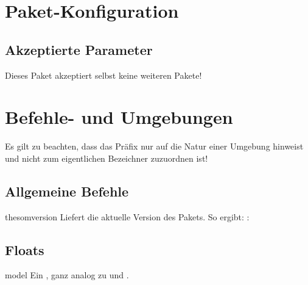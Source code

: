 \documentclass{sopra-base}
\begin{document}
\section{Paket-Konfiguration}
    \subsection{Akzeptierte Parameter}
    Dieses Paket akzeptiert selbst keine weiteren Pakete!

%
%

\section{Befehle- und Umgebungen}

Es gilt zu beachten, dass das Präfix  nur auf die Natur einer Umgebung hinweist und nicht zum eigentlichen Bezeichner zuzuordnen ist!

\subsection{Allgemeine Befehle}

\begin{command}{thesomversion}{}
    Liefert die aktuelle Version des Pakets. So ergibt: : \thesomversion\\
\end{command}

\subsection{Floats}

\begin{environment}{model}{}
    Ein , ganz analog zu  und .
\end{environment}
\end{document}
